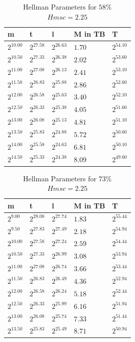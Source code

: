 \begin{table}[H]
  \centering
\begin{tabular}{lllll}
m & t & l & M in TB & T \\\hline
$2^{10.00}$ & $2^{27.58}$ & $2^{26.63}$ & $1.70$ & $2^{54.10}$ \\
$2^{10.50}$ & $2^{27.33}$ & $2^{26.38}$ & $2.02$ & $2^{53.60}$ \\
$2^{11.00}$ & $2^{27.08}$ & $2^{26.13}$ & $2.41$ & $2^{53.10}$ \\
$2^{11.50}$ & $2^{26.83}$ & $2^{25.88}$ & $2.86$ & $2^{52.60}$ \\
$2^{12.00}$ & $2^{26.58}$ & $2^{25.63}$ & $3.40$ & $2^{52.10}$ \\
$2^{12.50}$ & $2^{26.33}$ & $2^{25.38}$ & $4.05$ & $2^{51.60}$ \\
$2^{13.00}$ & $2^{26.08}$ & $2^{25.13}$ & $4.81$ & $2^{51.10}$ \\
$2^{13.50}$ & $2^{25.83}$ & $2^{24.88}$ & $5.72$ & $2^{50.60}$ \\
$2^{14.00}$ & $2^{25.58}$ & $2^{24.63}$ & $6.81$ & $2^{50.10}$ \\
$2^{14.50}$ & $2^{25.33}$ & $2^{24.38}$ & $8.09$ & $2^{49.60}$ \\
\end{tabular}
\caption{Hellman Parameters for $58\%$ $Hmsc = 2.25$}
\end{table}
\begin{table}[H]
  \centering
\begin{tabular}{lllll}
m & t & l & M in TB & T \\\hline
$2^{9.00}$ & $2^{28.08}$ & $2^{27.74}$ & $1.83$ & $2^{55.44}$ \\
$2^{9.50}$ & $2^{27.83}$ & $2^{27.49}$ & $2.18$ & $2^{54.94}$ \\
$2^{10.00}$ & $2^{27.58}$ & $2^{27.24}$ & $2.59$ & $2^{54.44}$ \\
$2^{10.50}$ & $2^{27.33}$ & $2^{26.99}$ & $3.08$ & $2^{53.94}$ \\
$2^{11.00}$ & $2^{27.08}$ & $2^{26.74}$ & $3.66$ & $2^{53.44}$ \\
$2^{11.50}$ & $2^{26.83}$ & $2^{26.49}$ & $4.36$ & $2^{52.94}$ \\
$2^{12.00}$ & $2^{26.58}$ & $2^{26.24}$ & $5.18$ & $2^{52.44}$ \\
$2^{12.50}$ & $2^{26.33}$ & $2^{25.99}$ & $6.16$ & $2^{51.94}$ \\
$2^{13.00}$ & $2^{26.08}$ & $2^{25.74}$ & $7.33$ & $2^{51.44}$ \\
$2^{13.50}$ & $2^{25.83}$ & $2^{25.49}$ & $8.71$ & $2^{50.94}$ \\
\end{tabular}
 \caption{Hellman Parameters for $73\%$ $Hmsc = 2.25$}
\end{table}
